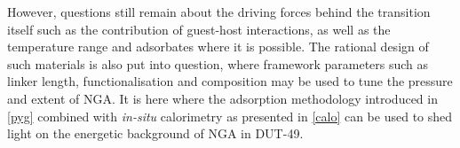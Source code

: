 However, questions still remain about the driving forces
behind the transition itself such as the contribution of 
guest-host interactions, as well as the temperature range 
and adsorbates where it is possible. The rational design 
of such materials is also put into question, where framework
parameters such as linker length, functionalisation and 
composition may be used to tune the pressure and extent of
NGA. It is here where the adsorption methodology introduced
in \autoref{pyg} combined with \textit{in-situ} calorimetry
as presented in \autoref{calo} can be used to shed light 
on the energetic background of NGA in DUT-49.
